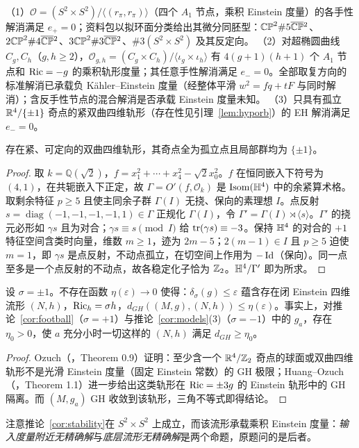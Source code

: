 \begin{corollary}[更多模型]\label{cor:models}
（1）$\mathcal O=(S^2\times S^2)/\langle(r_\pi,r_\pi)\rangle$（四个 $A_1$ 节点，乘积 Einstein 度量）的各手性解消满足 $e_+=0$；资料包以拟环面分类给出其微分同胚型：$\mathbb{CP}^2\#5\overline{\mathbb{CP}}{}^2$、$2\mathbb{CP}^2\#4\overline{\mathbb{CP}}{}^2$、$3\mathbb{CP}^2\#3\overline{\mathbb{CP}}{}^2$、$\#3(S^2\times S^2)$ 及其反定向。
（2）对超椭圆曲线 $C_g,C_h$（$g,h\ge2$），$\mathcal O_{g,h}=(C_g\times C_h)/\langle\iota_g\times\iota_h\rangle$ 有 $4(g+1)(h+1)$ 个 $A_1$ 节点和 $\operatorname{Ric}=-g$ 的乘积轨形度量；其任意手性解消满足 $e_-=0$。全部取复方向的标准解消已承载负 Kähler--Einstein 度量（经整体平滑 $w^2=fq+tF$ 与同时解消）；含反手性节点的混合解消是否承载 Einstein 度量未知。
（3）只具有孤立 $\mathbb R^4/\{\pm1\}$ 奇点的紧双曲四维轨形（存在性见引理~\ref{lem:hyporb}）的 EH 解消满足 $e_-=0$。
\end{corollary}

\begin{lemma}[所需双曲轨形的存在性]\label{lem:hyporb}
存在紧、可定向的双曲四维轨形，其奇点全为孤立点且局部群均为 $\{\pm1\}$。
\end{lemma}
\begin{proof}
取 $k=\mathbb Q(\sqrt2)$，$f=x_1^2+\cdots+x_4^2-\sqrt2x_0^2$。$f$ 在恒同嵌入下符号为 $(4,1)$，在共轭嵌入下正定，故 $\Gamma=O'(f,\mathcal O_k)$ 是 $\operatorname{Isom}(\mathbb H^4)$ 中的余紧算术格。取剩余特征 $p\ge5$ 且使主同余子群 $\Gamma(I)$ 无挠、保向的素理想 $I$。点反射 $s=\operatorname{diag}(-1,-1,-1,-1,1)\in\Gamma$ 正规化 $\Gamma(I)$，令 $\Gamma'=\Gamma(I)\rtimes\langle s\rangle$。$\Gamma'$ 的挠元必形如 $\gamma s$ 且为对合；$\gamma s\equiv s\pmod I$ 给 $\operatorname{tr}(\gamma s)\equiv-3$。保持 $\mathbb H^4$ 的对合的 $+1$ 特征空间含类时向量，维数 $m\ge1$，迹为 $2m-5$；$2(m-1)\in I$ 且 $p\ge5$ 迫使 $m=1$，即 $\gamma s$ 是点反射，不动点孤立，在切空间上作用为 $-\operatorname{Id}$（保向）。同一点至多是一个点反射的不动点，故各稳定化子恰为 $\mathbb Z_2$。$\mathbb H^4/\Gamma'$ 即为所求。
\end{proof}

\begin{corollary}[稳定性形式不成立]\label{cor:stability}
设 $\sigma=\pm1$。不存在函数 $\eta(\varepsilon)\to0$ 使得：$\delta_\sigma(g)\le\varepsilon$ 蕴含存在闭 Einstein 四维流形 $(N,h)$，$\operatorname{Ric}_h=\sigma h$，$d_{GH}((M,g),(N,h))\le\eta(\varepsilon)$。事实上，对推论~\ref{cor:football}（$\sigma=+1$）与推论~\ref{cor:models}(3)（$\sigma=-1$）中的 $g_a$，存在 $\eta_0>0$，使 $a$ 充分小时一切这样的 $(N,h)$ 满足 $d_{GH}\ge\eta_0$。
\end{corollary}
\begin{proof}
Ozuch（\cite{OzuchCPAM}，Theorem 0.9）证明：至少含一个 $\mathbb R^4/\mathbb Z_2$ 奇点的球面或双曲四维轨形不是光滑 Einstein 度量（固定 Einstein 常数）的 GH 极限；Huang--Ozuch（\cite{HuangOzuch}，Theorem 1.1）进一步给出这类轨形在 $\operatorname{Ric}=\pm3g$ 的 Einstein 轨形中的 GH 隔离。而 $(M,g_a)$ GH 收敛到该轨形，三角不等式即得结论。
\end{proof}

注意推论~\ref{cor:stability}在 $S^2\times S^2$ 上成立，而该流形承载乘积 Einstein 度量：\emph{输入度量附近无精确解}与\emph{底层流形无精确解}是两个命题，原题问的是后者。
